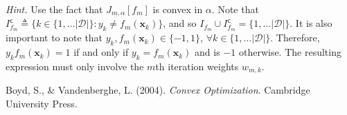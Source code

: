 \documentclass{article}
\numberwithin{equation}{section}
\begin{document}
\begin{enumerate}
    \medskip

    \textit{Hint.} Use the fact that $ J_{m, \alpha}[f_m] $ is convex in
    $ \alpha $. Note that $ I_{f_m}^\mathsf{c} \triangleq
    \{k \in \{1, \ldots |\mathcal{D}|\} : y_k \ne f_m(\mathbf{x}_k)\} $, and so
    $ I_{f_m} \cup I_{f_m}^\mathsf{c} = \{1, \ldots |\mathcal{D}|\} $. It is
    also important to note that $ y_k, f_m(\mathbf{x}_k) \in \{-1, 1\} $,
    $ \forall k \in \{1, \ldots |\mathcal{D}|\} $. Therefore,
    $ y_kf_m(\mathbf{x}_k) = 1 $ if and only if $ y_k = f_m(\mathbf{x}_k) $ and
    is $ -1 $ otherwise. The resulting expression must only involve the $ m $th
    iteration weights $ w_{m, k} $.

\end{enumerate}

\begin{thebibliography}{99}
    Boyd, S., \& Vandenberghe, L. (2004). \textit{Convex Optimization}.
    Cambridge University Press.
\end{thebibliography}
\end{document}
